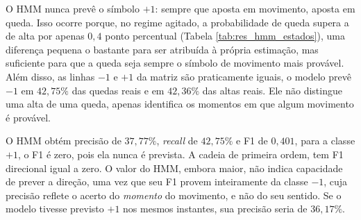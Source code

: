 \documentclass[
    12pt,                %
    openright,           %
    oneside,             %
    a4paper,             %
    english,             %
    brazil               %
]{abntex2}
\begin{document}
O HMM nunca prevê o símbolo $+1$: sempre que aposta em movimento, aposta em queda. Isso ocorre porque, no regime agitado, a probabilidade de queda 
supera a de alta por apenas $0{,}4$ ponto percentual (Tabela \ref{tab:res_hmm_estados}), uma diferença pequena o bastante para ser atribuída à 
própria estimação, mas suficiente para que a queda seja sempre o símbolo de movimento mais provável. Além disso, as linhas $-1$ e $+1$ da 
matriz são praticamente iguais, o modelo prevê $-1$ em $42{,}75\%$ das quedas reais e em $42{,}36\%$ das altas reais. 
Ele não distingue uma alta de uma queda, apenas identifica os momentos em que algum movimento é provável.

O HMM obtém precisão de $37{,}77\%$, \textit{recall} de $42{,}75\%$ e F1 de $0{,}401$, para a classe $+1$, o F1 é zero, pois ela nunca é prevista.
A cadeia de primeira ordem, tem F1 direcional igual a zero. O valor do HMM, embora maior, não indica capacidade de prever a direção, uma vez que 
seu F1 provem inteiramente da classe $-1$, cuja precisão 
reflete o acerto do \textit{momento} do movimento, e não do seu sentido. Se o modelo tivesse previsto $+1$ nos mesmos instantes, 
sua precisão seria de $36{,}17\%$.



\end{document}
